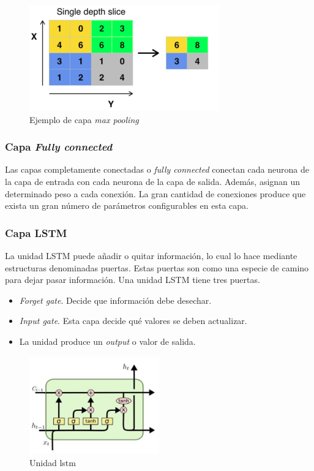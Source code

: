 \begin{figure}[H]
  \begin{center}
    \includegraphics[scale=0.4]{figures/Introduccion/pooling.png}
		\caption{Ejemplo de capa \textit{max pooling}}
		\label{fig.pooling}
		\end{center}
\end{figure}


\subsubsection{Capa \textit{Fully connected}}

Las capas completamente conectadas o \textit{fully connected} conectan cada neurona de la capa de entrada con cada neurona de la capa de salida. Además, asignan un determinado peso a cada conexión. La gran cantidad de conexiones produce que exista un gran número de parámetros configurables en esta capa.


\subsubsection{Capa LSTM}

La unidad LSTM puede añadir o quitar información, lo cual lo hace mediante estructuras denominadas puertas. Estas puertas son como una especie de camino para dejar pasar información. Una unidad LSTM tiene tres puertas.

\begin{itemize}
    \item \textit{Forget gate}. Decide que información debe desechar. 
    \item \textit{Input gate}. Esta capa decide qué valores se deben actualizar.
    \item La unidad produce un \textit{output} o valor de salida.
\end{itemize}

\begin{figure}[H]
  \begin{center}
    \includegraphics[width=0.5\textwidth]{figures/Introduccion/unidad_lstm.png}
		\caption{Unidad \acrshort{lstm}}
		\label{fig.unidad_lstm}
		\end{center}
\end{figure}
